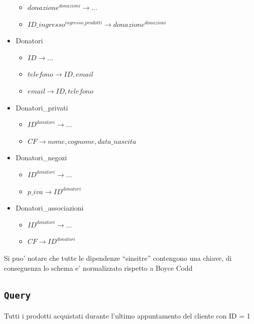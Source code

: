 \documentclass[]{article}
\providecommand{\tightlist}{%
  \setlength{\itemsep}{0pt}\setlength{\parskip}{0pt}}
\begin{document}
\begin{itemize}
  \begin{itemize}
  \tightlist
  \item
    \(donazione^{donazioni} \to ...\)
  \item
    \(ID\_ingresso^{ingresso\_prodotti} \to donazione^{donazioni}\)
  \end{itemize}
\item
  Donatori

  \begin{itemize}
  \tightlist
  \item
    \(ID \to ...\)
  \item
    \(telefono \to ID, email\)
  \item
    \(email \to ID, telefono\)
  \end{itemize}
\item
  Donatori\_privati

  \begin{itemize}
  \tightlist
  \item
    \(ID^{donatori} \to ...\)
  \item
    \(CF \to nome, cognome, data\_nascita\)
  \end{itemize}
\item
  Donatori\_negozi

  \begin{itemize}
  \tightlist
  \item
    \(ID^{donatori} \to ...\)
  \item
    \(p\_iva \to ID^{donatori}\)
  \end{itemize}
\item
  Donatori\_associazioni

  \begin{itemize}
  \tightlist
  \item
    \(ID^{donatori} \to ...\)
  \item
    \(CF \to ID^{donatori}\)
  \end{itemize}
\end{itemize}

Si puo' notare che tutte le dipendenze ``sinsitre'' contengono una
chiave, di conseguenza lo schema e' normalizzato rispetto a Boyce Codd

\hypertarget{query}{%
\subsection{\texorpdfstring{\texttt{Query}}{Query}}\label{query}}

Tutti i prodotti acquistati durante l'ultimo appuntamento del cliente
con ID = 1
\end{document}

